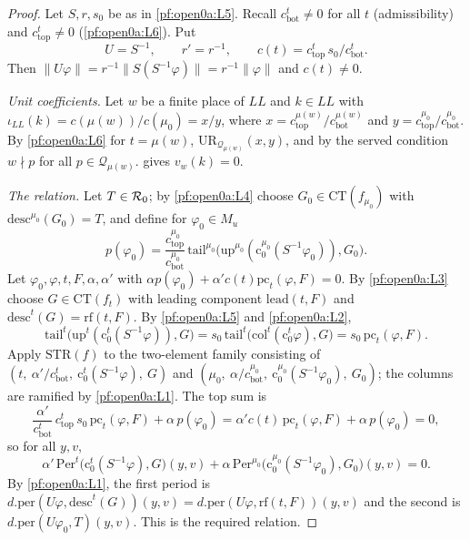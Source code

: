 \begin{proof}
Let $S,r,s_0$ be as in \ref{pf:open0a:L5}. Recall $c_{\mathrm{bot}}^t\ne0$ for all $t$ (admissibility) and
$c_{\mathrm{top}}^t\ne0$ (\ref{pf:open0a:L6}). Put
\[
U=S^{-1},\qquad r'=r^{-1},\qquad c(t)=c_{\mathrm{top}}^t\,s_0/c_{\mathrm{bot}}^t.
\]
Then $\|U\varphi\|=r^{-1}\|S(S^{-1}\varphi)\|=r^{-1}\|\varphi\|$ and $c(t)\ne0$.

\emph{Unit coefficients.} Let $w$ be a finite place of $\mathit{LL}$ and $k\in\mathit{LL}$ with
$\iota_{\mathit{LL}}(k)=c(\mu(w))/c(\mu_0)=x/y$, where $x=c_{\mathrm{top}}^{\mu(w)}/c_{\mathrm{bot}}^{\mu(w)}$ and
$y=c_{\mathrm{top}}^{\mu_0}/c_{\mathrm{bot}}^{\mu_0}$. By \ref{pf:open0a:L6} for $t=\mu(w)$,
$\mathrm{UR}_{\mathcal Q_{\mu(w)}}(x,y)$, and by the served condition $w\nmid p$ for all $p\in\mathcal Q_{\mu(w)}$.
 gives $v_w(k)=0$.

\emph{The relation.} Let $T\in\mathcal{R}_0$; by \ref{pf:open0a:L4} choose $G_0\in\mathrm{CT}(f_{\mu_0})$ with
$\mathrm{desc}^{\mu_0}(G_0)=T$, and define for $\varphi_0\in M_u$
\[
p(\varphi_0)=\frac{c_{\mathrm{top}}^{\mu_0}}{c_{\mathrm{bot}}^{\mu_0}}\,
\mathrm{tail}^{\mu_0}\bigl(\mathrm{up}^{\mu_0}(\mathrm c_0^{\mu_0}(S^{-1}\varphi_0)),G_0\bigr).
\]
Let $\varphi_0,\varphi,t,F,\alpha,\alpha'$ with $\alpha p(\varphi_0)+\alpha'c(t)\mathrm{pc}_t(\varphi,F)=0$. By
\ref{pf:open0a:L3} choose $G\in\mathrm{CT}(f_t)$ with leading component $\mathrm{lead}(t,F)$ and
$\mathrm{desc}^t(G)=\mathrm{rf}(t,F)$. By \ref{pf:open0a:L5} and \ref{pf:open0a:L2},
\[
\mathrm{tail}^t\bigl(\mathrm{up}^t(\mathrm c_0^t(S^{-1}\varphi)),G\bigr)
=s_0\,\mathrm{tail}^t\bigl(\mathrm{col}^t(\mathrm c_0^t\varphi),G\bigr)=s_0\,\mathrm{pc}_t(\varphi,F).
\]
Apply $\mathrm{STR}(f)$ to the two-element family consisting of
$(t,\ \alpha'/c_{\mathrm{bot}}^t,\ \mathrm c_0^t(S^{-1}\varphi),\ G)$ and
$(\mu_0,\ \alpha/c_{\mathrm{bot}}^{\mu_0},\ \mathrm c_0^{\mu_0}(S^{-1}\varphi_0),\ G_0)$; the columns are ramified by
\ref{pf:open0a:L1}. The top sum is
\[
\frac{\alpha'}{c_{\mathrm{bot}}^t}\,c_{\mathrm{top}}^t\,s_0\,\mathrm{pc}_t(\varphi,F)+\alpha\,p(\varphi_0)
=\alpha'c(t)\,\mathrm{pc}_t(\varphi,F)+\alpha\,p(\varphi_0)=0,
\]
so for all $y,v$,
\[
\alpha'\,\mathrm{Per}^t\bigl(\mathrm c_0^t(S^{-1}\varphi),G\bigr)(y,v)
+\alpha\,\mathrm{Per}^{\mu_0}\bigl(\mathrm c_0^{\mu_0}(S^{-1}\varphi_0),G_0\bigr)(y,v)=0.
\]
By \ref{pf:open0a:L1}, the first period is $d.\mathrm{per}(U\varphi,\mathrm{desc}^t(G))(y,v)=
d.\mathrm{per}(U\varphi,\mathrm{rf}(t,F))(y,v)$ and the second is $d.\mathrm{per}(U\varphi_0,T)(y,v)$. This is the
required relation.
\end{proof}

